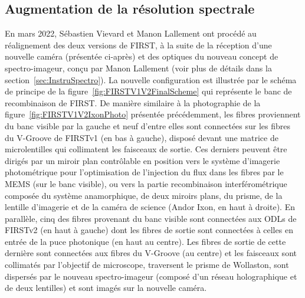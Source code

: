 \subsection{Augmentation de la résolution spectrale}
\label{sec:V1V2Subaru}

En mars 2022, Sébastien Vievard et Manon Lallement ont procédé au réalignement des deux versions de \ac{FIRST}, à la suite de la réception d'une nouvelle caméra (présentée ci-après) et des optiques du nouveau concept de spectro-imageur, conçu par Manon Lallement (voir plus de détails dans la section~\ref{sec:InstruSpectro}). La nouvelle configuration est illustrée par le schéma de principe de la figure~\ref{fig:FIRSTV1V2FinalScheme} qui représente le banc de recombinaison de \ac{FIRST}. De manière similaire à la photographie de la figure~\ref{fig:FIRSTV1V2IxonPhoto} présentée précédemment, les fibres proviennent du banc visible par la gauche et neuf d'entre elles sont connectées sur les fibres du V-Groove de \ac{FIRSTv1} (en bas à gauche), disposé devant une matrice de microlentilles qui collimatent les faisceaux de sortie. Ces derniers peuvent être dirigés par un miroir plan contrôlable en position vers le système d'imagerie photométrique pour l'optimisation de l'injection du flux dans les fibres par le \ac{MEMS} (sur le banc visible), ou vers la partie recombinaison interférométrique composée du système anamorphique, de deux miroirs plans, du prisme, de la lentille d'imagerie et de la caméra de science (Andor Ixon, en haut à droite). En parallèle, cinq des fibres provenant du banc visible sont connectées aux \ac{ODL}s de \ac{FIRSTv2} (en haut à gauche) dont les fibres de sortie sont connectées à celles en entrée de la puce photonique (en haut au centre). Les fibres de sortie de cette dernière sont connectées aux fibres du V-Groove (au centre) et les faisceaux sont collimatés par l'objectif de microscope, traversent le prisme de Wollaston, sont dispersés par le nouveau spectro-imageur (composé d'un réseau holographique et de deux lentilles) et sont imagés sur la nouvelle caméra.

